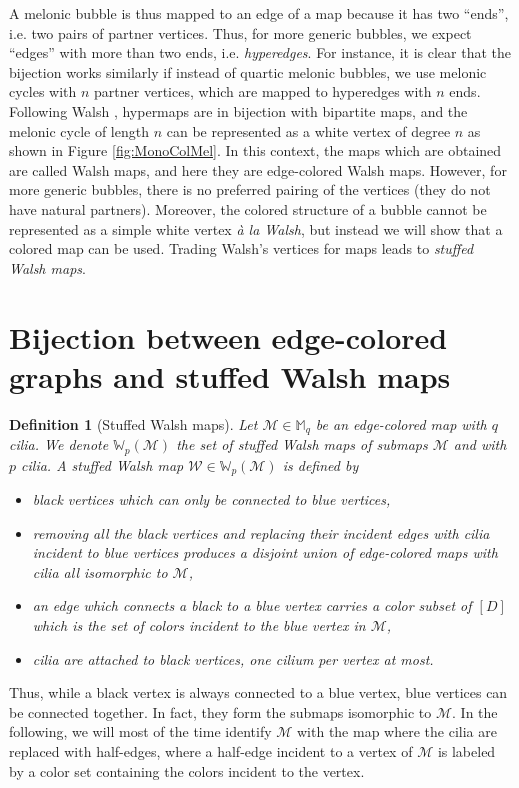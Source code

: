 \documentclass[aps,prd,10pt,notitlepage,nofootinbib,superscriptaddress,showkeys,showpacs]{revtex4-1}
\newtheorem{definition}{Definition}
\begin{document}
A melonic bubble is thus mapped to an edge of a map because it has two ``ends'', i.e. two pairs of partner vertices. Thus, for more generic bubbles, we expect ``edges'' with more than two ends, i.e. \emph{hyperedges}. For instance, it is clear that the bijection works similarly if instead of quartic melonic bubbles, we use melonic cycles with $n$ partner vertices, which are mapped to hyperedges with $n$ ends. Following Walsh \cite{Walsh}, hypermaps are in bijection with bipartite maps, and the melonic cycle of length $n$ can be represented as a white vertex of degree $n$ as shown in Figure \ref{fig:MonoColMel}. In this context, the maps which are obtained are called Walsh maps, and here they are edge-colored Walsh maps. However, for more generic bubbles, there is no preferred pairing of the vertices (they do not have natural partners). Moreover, the colored structure of a bubble cannot be represented as a simple white vertex {\it \`a la Walsh}, but instead we will show that a colored map can be used. Trading Walsh's vertices for maps leads to \emph{stuffed Walsh maps}.

\section{Bijection between edge-colored graphs and stuffed Walsh maps} \label{sec:Bijection}

\begin{definition}[Stuffed Walsh maps] \label{def:StuffedWalshMaps}
Let ${\mathcal{M}}\in{\mathbb{M}}_q$ be an edge-colored map with $q$ cilia. We denote ${\mathbb{W}}_p({\mathcal{M}})$ the set of stuffed Walsh maps of submaps ${\mathcal{M}}$ and with $p$ cilia. A stuffed Walsh map ${\mathcal{W}}\in {\mathbb{W}}_p({\mathcal{M}})$ is defined by
\begin{itemize}
\item black vertices which can only be connected to blue vertices,
\item removing all the black vertices and replacing their incident edges with cilia incident to blue vertices produces a disjoint union of edge-colored maps with cilia all isomorphic to ${\mathcal{M}}$,
\item an edge which connects a black to a blue vertex carries a color subset of $[D]$ which is the set of colors incident to the blue vertex in ${\mathcal{M}}$,
\item cilia are attached to black vertices, one cilium per vertex at most.
\end{itemize}
\end{definition}
Thus, while a black vertex is always connected to a blue vertex, blue vertices can be connected together. In fact, they form the submaps isomorphic to ${\mathcal{M}}$. In the following, we will most of the time identify ${\mathcal{M}}$ with the map where the cilia are replaced with half-edges, where a half-edge incident to a vertex of ${\mathcal{M}}$ is labeled by a color set containing the colors incident to the vertex.
\end{document}

